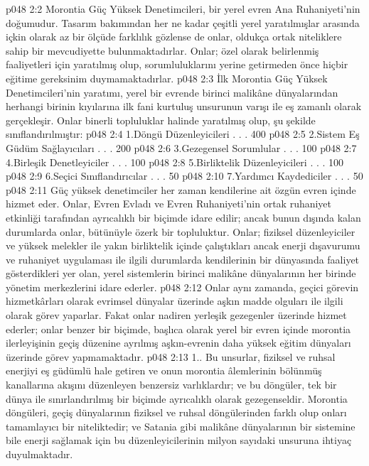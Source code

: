 \vs p048 2:2 Morontia Güç Yüksek Denetimcileri, bir yerel evren Ana Ruhaniyeti’nin doğumudur. Tasarım bakımından her ne kadar çeşitli yerel yaratılmışlar arasında içkin olarak az bir ölçüde farklılık gözlense de onlar, oldukça ortak niteliklere sahip bir mevcudiyette bulunmaktadırlar. Onlar; özel olarak belirlenmiş faaliyetleri için yaratılmış olup, sorumluluklarını yerine getirmeden önce hiçbir eğitime gereksinim duymamaktadırlar.
\vs p048 2:3 İlk Morontia Güç Yüksek Denetimcileri’nin yaratımı, yerel bir evrende birinci malikâne dünyalarından herhangi birinin kıyılarına ilk fani kurtuluş unsurunun varışı ile eş zamanlı olarak gerçekleşir. Onlar binerli topluluklar halinde yaratılmış olup, şu şekilde sınıflandırılmıştır:
\vs p048 2:4 1.\bibnobreakspace Döngü Düzenleyicileri . . . 400
\vs p048 2:5 2.\bibnobreakspace Sistem Eş Güdüm Sağlayıcıları . . . 200
\vs p048 2:6 3.\bibnobreakspace Gezegensel Sorumlular . . . 100
\vs p048 2:7 4.\bibnobreakspace Birleşik Denetleyiciler . . . 100
\vs p048 2:8 5.\bibnobreakspace Birliktelik Düzenleyicileri . . . 100
\vs p048 2:9 6.\bibnobreakspace Seçici Sınıflandırıcılar . . . 50
\vs p048 2:10 7.\bibnobreakspace Yardımcı Kaydediciler . . . 50
\vs p048 2:11 Güç yüksek denetimciler her zaman kendilerine ait özgün evren içinde hizmet eder. Onlar, Evren Evladı ve Evren Ruhaniyeti’nin ortak ruhaniyet etkinliği tarafından ayrıcalıklı bir biçimde idare edilir; ancak bunun dışında kalan durumlarda onlar, bütünüyle özerk bir topluluktur. Onlar; fiziksel düzenleyiciler ve yüksek melekler ile yakın birliktelik içinde çalıştıkları ancak enerji dışavurumu ve ruhaniyet uygulaması ile ilgili durumlarda kendilerinin bir dünyasında faaliyet gösterdikleri yer olan, yerel sistemlerin birinci malikâne dünyalarının her birinde yönetim merkezlerini idare ederler.
\vs p048 2:12 Onlar aynı zamanda, geçici görevin hizmetkârları olarak evrimsel dünyalar üzerinde aşkın madde olguları ile ilgili olarak görev yaparlar. Fakat onlar nadiren yerleşik gezegenler üzerinde hizmet ederler; onlar benzer bir biçimde, başlıca olarak yerel bir evren içinde morontia ilerleyişinin geçiş düzenine ayrılmış aşkın\hyp{}evrenin daha yüksek eğitim dünyaları üzerinde görev yapmamaktadır.
\vs p048 2:13 1.\bibnobreakspace {}. Bu unsurlar, fiziksel ve ruhsal enerjiyi eş güdümlü hale getiren ve onun morontia âlemlerinin bölünmüş kanallarına akışını düzenleyen benzersiz varlıklardır; ve bu döngüler, tek bir dünya ile sınırlandırılmış bir biçimde ayrıcalıklı olarak gezegenseldir. Morontia döngüleri, geçiş dünyalarının fiziksel ve ruhsal döngülerinden farklı olup onları tamamlayıcı bir niteliktedir; ve Satania gibi malikâne dünyalarının bir sistemine bile enerji sağlamak için bu düzenleyicilerinin milyon sayıdaki unsuruna ihtiyaç duyulmaktadır.
